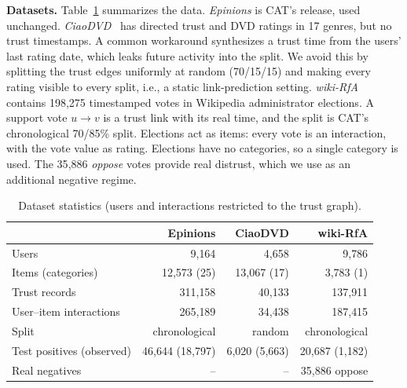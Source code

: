 \documentclass[conference]{IEEEtran}
\begin{document}
\textbf{Datasets.} Table~\ref{tab:data} summarizes the data.
\emph{Epinions} is CAT's release, used unchanged.
\emph{CiaoDVD}~\cite{guo2014etaf} has directed trust and DVD ratings in 17 genres, but no trust timestamps. A common workaround synthesizes a trust time from the users' last rating date, which leaks future activity into the split. We avoid this by splitting the trust edges uniformly at random (70/15/15) and making every rating visible to every split, i.e., a static link-prediction setting.
\emph{wiki-RfA}~\cite{west2014exploiting} contains 198{,}275 timestamped votes in Wikipedia administrator elections. A support vote $u\to v$ is a trust link with its real time, and the split is CAT's chronological 70/85\% split. Elections act as items: every vote is an interaction, with the vote value as rating. Elections have no categories, so a single category is used. The 35{,}886 \emph{oppose} votes provide real distrust, which we use as an additional negative regime.

\begin{table}[t]
\centering
\caption{Dataset statistics (users and interactions restricted to the trust graph).}
\label{tab:data}
\setlength{\tabcolsep}{3.5pt}
\begin{tabular}{lrrr}
\toprule
& Epinions & CiaoDVD & wiki-RfA \\
\midrule
Users & 9{,}164 & 4{,}658 & 9{,}786 \\
Items (categories) & 12{,}573 (25) & 13{,}067 (17) & 3{,}783 (1) \\
Trust records & 311{,}158 & 40{,}133 & 137{,}911 \\
User--item interactions & 265{,}189 & 34{,}438 & 187{,}415 \\
Split & chronological & random & chronological \\
Test positives (observed) & 46{,}644 (18{,}797) & 6{,}020 (5{,}663) & 20{,}687 (1{,}182) \\
Real negatives & -- & -- & 35{,}886 oppose \\
\bottomrule
\end{tabular}
\end{table}
\end{document}
